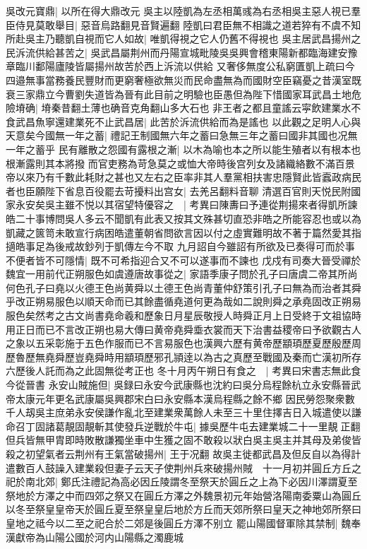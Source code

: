 吳改元寶鼎|{
	以所在得大鼎改元}
吳主以陸凱為左丞相萬彧為右丞相吳主惡人視已羣臣侍見莫敢舉目|{
	惡音烏路翻見音賢遍翻}
陸凱曰君臣無不相識之道若猝有不虞不知所赴吳主乃聽凱自視而它人如故|{
	唯凱得視之它人仍舊不得視也}
吳主居武昌揚州之民泝流供給甚苦之|{
	吳武昌屬荆州而丹陽宣城毗陵吳吳興會稽東陽新都臨海建安豫章臨川鄱陽廬陵皆屬揚州故苦於西上泝流以供給}
又奢侈無度公私窮匱凱上疏曰今四邉無事當務養民豐財而更窮奢極欲無災而民命盡無為而國財空臣竊憂之昔漢室既衰三家鼎立今曹劉失道皆為晉有此目前之明驗也臣愚但為陛下惜國家耳武昌土地危險塉确|{
	塉秦昔翻土薄也确音克角翻山多大石也}
非王者之都且童謠云寜飲建業水不食武昌魚寧還建業死不止武昌居|{
	此苦於泝流供給而為是謠也}
以此觀之足明人心與天意矣今國無一年之蓄|{
	禮記王制國無六年之蓄曰急無三年之蓄曰國非其國也况無一年之蓄乎}
民有離散之怨國有露根之漸|{
	以木為喻也本之所以能生殖者以有根本也根漸露則其本將撥}
而官吏務為苛急莫之或恤大帝時後宫列女及諸織絡數不滿百景帝以來乃有千數此耗財之甚也又左右之臣率非其人羣黨相扶害忠隱賢此皆蠧政病民者也臣願陛下省息百役罷去苛擾料出宫女|{
	去羌呂翻料音聊}
清選百官則天悦民附國家永安矣吳主雖不悦以其宿望特優容之　|{
	考異曰陳夀曰予連從荆揚來者得凱所諫皓二十事博問吳人多云不聞凱有此表又按其文殊甚切直恐非皓之所能容忍也或以為凱藏之篋笥未敢宣行病困皓遣董朝省問欲言因以付之虛實難明故不著于篇然愛其指擿皓事足為後戒故鈔列于凱傳左今不取}
九月詔自今雖詔有所欲及已奏得可而於事不便者皆不可隱情|{
	既不可希指迎合又不可以遂事而不諫也}
戊戍有司奏大晉受禪於魏宜一用前代正朔服色如虞遵唐故事從之|{
	家語季康子問於孔子曰唐虞二帝其所尚何色孔子曰堯以火德王色尚黄舜以土德王色尚青董仲舒策引孔子曰無為而治者其舜乎改正朔易服色以順天命而已其餘盡循堯道何更為哉如二說則舜之承堯固改正朔易服色矣然考之古文尚書堯命羲和歷象日月星辰敬授人時舜正月上日受終于文祖協時用正日而已不言改正朔也易大傳曰黄帝堯舜埀衣裳而天下治書益稷帝曰予欲觀古人之象以五采彰施于五色作服而已不言易服色也漢興六歷有黄帝歷顓頊歷夏歷殷歷周歷魯歷無堯舜歷豈堯舜時用顓頊歷邪孔頴逹以為古之真歷至戰國及秦而亡漢初所存六歷後人託而為之此固無從考正也}
冬十月丙午朔日有食之　|{
	考異曰宋書志無此食今從晉書}
永安山賊施但|{
	吳録曰永安今武康縣也沈約曰吳分烏程餘杭立永安縣晉武帝太康元年更名武康屬吳興郡宋白曰永安縣本漢烏程縣之餘不鄉}
因民勞怨聚衆數千人刼吳主庶弟永安侯謙作亂北至建業衆萬餘人未至三十里住擇吉日入城遣使以謙命召丁固諸葛靚固靚斬其使發兵逆戰於牛屯|{
	據吳歷牛屯去建業城二十一里靚正翻}
但兵皆無甲胄即時敗散謙獨坐車中生獲之固不敢殺以狀白吳主吳主并其母及弟俊皆殺之初望氣者云荆州有王氣當破揚州|{
	王于况翻}
故吳主徙都武昌及但反自以為得計遣數百人鼓譟入建業殺但妻子云天子使荆州兵來破揚州賊　十一月初并圓丘方丘之祀於南北郊|{
	鄭氏注禮記為高必因丘陵謂冬至祭天於圓丘之上為下必因川澤謂夏至祭地於方澤之中而四郊之祭又在圓丘方澤之外魏景初元年始營洛陽南委粟山為圓丘以冬至祭皇皇帝天於圓丘夏至祭皇皇后地於方丘而天郊所祭曰皇天之神地郊所祭曰皇地之祗今以二至之祀合於二郊是後圓丘方澤不别立}
罷山陽國督軍除其禁制|{
	魏奉漢獻帝為山陽公國於河内山陽縣之濁鹿城}



